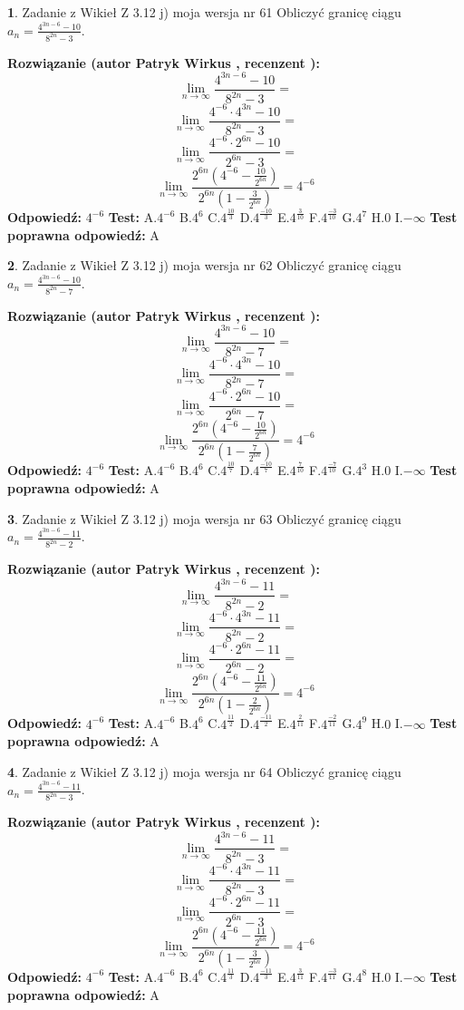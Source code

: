 \documentclass[12pt, a4paper]{article}
\theoremstyle{definition} %
\newtheorem{zad}{}
\newcommand{\zadStart}[1]{\begin{zad}#1\newline}
\newcommand{\zadStop}{\end{zad}}
\newcommand{\rozwStart}[2]{\noindent \textbf{Rozwiązanie (autor #1 , recenzent #2): }\newline}
\newcommand{\rozwStop}{\newline}
\newcommand{\odpStart}{\noindent \textbf{Odpowiedź:}\newline}
\newcommand{\odpStop}{\newline}
\newcommand{\testStart}{\noindent \textbf{Test:}\newline}
\newcommand{\testStop}{\newline}
\newcommand{\kluczStart}{\noindent \textbf{Test poprawna odpowiedź:}\newline}
\newcommand{\kluczStop}{\newline}
\begin{document}
\zadStart{Zadanie z Wikieł Z 3.12 j) moja wersja nr 61}
Obliczyć granicę ciągu $a_{n}=\frac{4^{3n-6}-10}{8^{2n}-3}$.
\zadStop
\rozwStart{Patryk Wirkus}{}
$$\lim\limits_{n\to\infty}\frac{4^{3n-6}-10}{8^{2n}-3}=$$
$$\lim\limits_{n\to\infty}\frac{4^{-6} \cdot 4^{3n}-10}{8^{2n}-3}=$$
$$\lim\limits_{n\to\infty}\frac{4^{-6} \cdot 2^{6n}-10}{2^{6n}-3}=$$
$$\lim\limits_{n\to\infty}\frac{2^{6n}(4^{-6} - \frac{10}{2^{6n}})}{2^{6n}(1-\frac{3}{2^{6n}})}= 4^{-6}$$
\rozwStop
\odpStart
$4^{-6}$
\odpStop
\testStart
A.$4^{-6}$
B.$4^{6}$
C.$4^{\frac{10}{3}}$
D.$4^{\frac{-10}{3}}$
E.$4^{\frac{3}{10}}$
F.$4^{\frac{-3}{10}}$
G.$4^{7}$
H.$0$
I.$-\infty$
\testStop
\kluczStart
A
\kluczStop



\zadStart{Zadanie z Wikieł Z 3.12 j) moja wersja nr 62}
Obliczyć granicę ciągu $a_{n}=\frac{4^{3n-6}-10}{8^{2n}-7}$.
\zadStop
\rozwStart{Patryk Wirkus}{}
$$\lim\limits_{n\to\infty}\frac{4^{3n-6}-10}{8^{2n}-7}=$$
$$\lim\limits_{n\to\infty}\frac{4^{-6} \cdot 4^{3n}-10}{8^{2n}-7}=$$
$$\lim\limits_{n\to\infty}\frac{4^{-6} \cdot 2^{6n}-10}{2^{6n}-7}=$$
$$\lim\limits_{n\to\infty}\frac{2^{6n}(4^{-6} - \frac{10}{2^{6n}})}{2^{6n}(1-\frac{7}{2^{6n}})}= 4^{-6}$$
\rozwStop
\odpStart
$4^{-6}$
\odpStop
\testStart
A.$4^{-6}$
B.$4^{6}$
C.$4^{\frac{10}{7}}$
D.$4^{\frac{-10}{7}}$
E.$4^{\frac{7}{10}}$
F.$4^{\frac{-7}{10}}$
G.$4^{3}$
H.$0$
I.$-\infty$
\testStop
\kluczStart
A
\kluczStop



\zadStart{Zadanie z Wikieł Z 3.12 j) moja wersja nr 63}
Obliczyć granicę ciągu $a_{n}=\frac{4^{3n-6}-11}{8^{2n}-2}$.
\zadStop
\rozwStart{Patryk Wirkus}{}
$$\lim\limits_{n\to\infty}\frac{4^{3n-6}-11}{8^{2n}-2}=$$
$$\lim\limits_{n\to\infty}\frac{4^{-6} \cdot 4^{3n}-11}{8^{2n}-2}=$$
$$\lim\limits_{n\to\infty}\frac{4^{-6} \cdot 2^{6n}-11}{2^{6n}-2}=$$
$$\lim\limits_{n\to\infty}\frac{2^{6n}(4^{-6} - \frac{11}{2^{6n}})}{2^{6n}(1-\frac{2}{2^{6n}})}= 4^{-6}$$
\rozwStop
\odpStart
$4^{-6}$
\odpStop
\testStart
A.$4^{-6}$
B.$4^{6}$
C.$4^{\frac{11}{2}}$
D.$4^{\frac{-11}{2}}$
E.$4^{\frac{2}{11}}$
F.$4^{\frac{-2}{11}}$
G.$4^{9}$
H.$0$
I.$-\infty$
\testStop
\kluczStart
A
\kluczStop



\zadStart{Zadanie z Wikieł Z 3.12 j) moja wersja nr 64}
Obliczyć granicę ciągu $a_{n}=\frac{4^{3n-6}-11}{8^{2n}-3}$.
\zadStop
\rozwStart{Patryk Wirkus}{}
$$\lim\limits_{n\to\infty}\frac{4^{3n-6}-11}{8^{2n}-3}=$$
$$\lim\limits_{n\to\infty}\frac{4^{-6} \cdot 4^{3n}-11}{8^{2n}-3}=$$
$$\lim\limits_{n\to\infty}\frac{4^{-6} \cdot 2^{6n}-11}{2^{6n}-3}=$$
$$\lim\limits_{n\to\infty}\frac{2^{6n}(4^{-6} - \frac{11}{2^{6n}})}{2^{6n}(1-\frac{3}{2^{6n}})}= 4^{-6}$$
\rozwStop
\odpStart
$4^{-6}$
\odpStop
\testStart
A.$4^{-6}$
B.$4^{6}$
C.$4^{\frac{11}{3}}$
D.$4^{\frac{-11}{3}}$
E.$4^{\frac{3}{11}}$
F.$4^{\frac{-3}{11}}$
G.$4^{8}$
H.$0$
I.$-\infty$
\testStop
\kluczStart
A
\kluczStop
\end{document}
